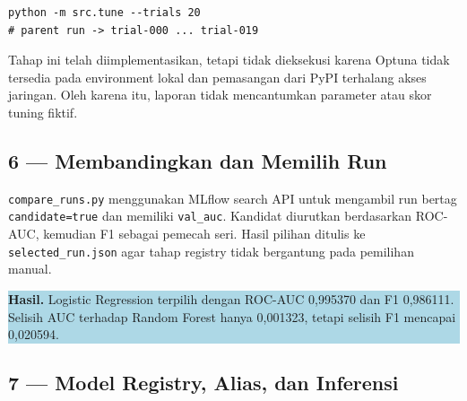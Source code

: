 \documentclass[11pt,a4paper]{article}
\newcommand{\resultbox}[1]{%
  \begin{center}
    \colorbox{lightblue}{\parbox{0.91\linewidth}{\textbf{Hasil.} #1}}
  \end{center}
}
\begin{document}
\begin{lstlisting}[style=terminal]
python -m src.tune --trials 20
# parent run -> trial-000 ... trial-019
\end{lstlisting}

Tahap ini telah diimplementasikan, tetapi tidak dieksekusi karena Optuna tidak tersedia pada environment lokal dan pemasangan dari PyPI terhalang akses jaringan. Oleh karena itu, laporan tidak mencantumkan parameter atau skor tuning fiktif.

\subsection{6 --- Membandingkan dan Memilih Run}

\texttt{compare\_runs.py} menggunakan MLflow search API untuk mengambil run bertag \texttt{candidate=true} dan memiliki \texttt{val\_auc}. Kandidat diurutkan berdasarkan ROC-AUC, kemudian F1 sebagai pemecah seri. Hasil pilihan ditulis ke \texttt{selected\_run.json} agar tahap registry tidak bergantung pada pemilihan manual.

\begin{center}
\end{center}

\resultbox{Logistic Regression terpilih dengan ROC-AUC 0,995370 dan F1 0,986111. Selisih AUC terhadap Random Forest hanya 0,001323, tetapi selisih F1 mencapai 0,020594.}

\subsection{7 --- Model Registry, Alias, dan Inferensi}
\end{document}

